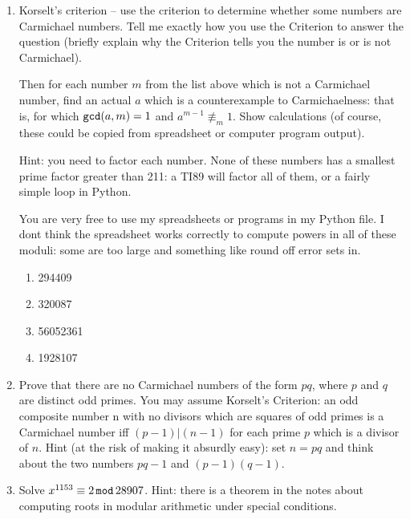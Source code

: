 \documentclass[12pt]{article}
\begin{document}
\begin{enumerate}

\item  Korselt's criterion -- use the criterion to determine whether some numbers are Carmichael numbers.   Tell me exactly how you use the Criterion to answer the question (briefly explain why the Criterion tells you the number is or is not Carmichael).

Then for each number $m$ from the list above which is not a Carmichael number, find an actual
$a$ which is a counterexample to Carmichaelness:  that is, for which ${\tt gcd}(a,m)=1$ and $a^{m-1} \not\equiv_m 1$.  Show calculations (of course, these could be copied from spreadsheet or computer program output).

Hint:  you need to factor each number.  None of these numbers has a smallest prime factor greater than 211:  a TI89 will factor all of them, or a fairly simple loop in Python.

You are very free to use my spreadsheets or programs in my Python file.  I dont think the spreadsheet works correctly to compute powers in all of these moduli:  some are too large and something like round off error sets in.

\begin{enumerate}

\item 294409

\item  320087

\item  56052361

\item  1928107

\end{enumerate}

\newpage

\item  Prove that there are no Carmichael numbers of the form $pq$, where $p$
and $q$ are distinct odd primes. You may assume Korselt's Criterion:
an odd composite number n with no divisors which are squares of odd
primes is a Carmichael number iff  $(p - 1)|(n - 1)$ for each prime $p$ which
is a divisor of $n$.
Hint (at the risk of making it absurdly easy): set $n = pq$ and think
about the two numbers $pq - 1$ and $(p - 1)(q - 1)$.

\newpage

\item Solve $x^{1153}\equiv 2 \,{\tt mod} \,28907$.  Hint:  there is a theorem in the notes about computing roots in modular arithmetic under special conditions.


\end{enumerate}
\end{document}
